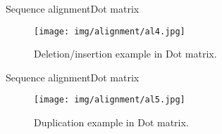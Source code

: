 \documentclass[10pt]{beamer}
\newcommand{\1}{
	\setbeamertemplate{background}{
		\texttt{[image: img/1]}
		\tikz[overlay] \fill[fill opacity=0.75,fill=white] (0,0) rectangle (-\paperwidth,\paperheight);
	}
}
\begin{document}
\begin{frame}{Sequence alignment}{Dot matrix}
	
	\begin{figure}[]
		\centering
		\texttt{[image: img/alignment/al4.jpg]}
		\label{img:uniprot}
		\caption{Deletion/insertion example in Dot matrix.}
	\end{figure}
\end{frame}

\begin{frame}{Sequence alignment}{Dot matrix}
	
	\begin{figure}[]
		\centering
		\texttt{[image: img/alignment/al5.jpg]}
		\label{img:uniprot}
		\caption{Duplication example in Dot matrix.}
	\end{figure}
\end{frame}

	

	
\end{document}
